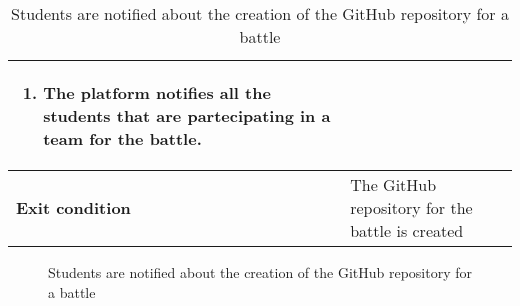 \begin{enumerate}[label=\textbf{UC\arabic*}:,ref=UC\arabic*,leftmargin=1.3cm]
{\begin{table}[H]
\begin{tabular}{|l|p{11.9cm}|}
\begin{enumerate}[label=\arabic*.]
                              \item The platform notifies all the students that are partecipating in a team for the battle.
                        \end{enumerate}                        \\\hline
                        \textbf{Exit condition}  & The GitHub repository for the battle is created                                                          \\\hline
                  \end{tabular}
                  \caption{Students are notified about the creation of the GitHub repository for a battle  }
                  \label{table:Students are notified about the creation of the GitHub repository for a battle}
            \end{table}
            \begin{figure}[H]
                  \centering
                  \caption{Students are notified about the creation of the GitHub repository for a battle}
                  \label{fig:Students are notified about the creation of the GitHub repository for a battle}
            \end{figure}
            \pagebreak
      }
\end{enumerate}
